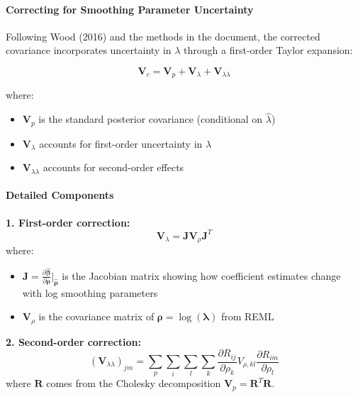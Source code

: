 \documentclass[12pt]{article}
\begin{document}
\paragraph{Correcting for Smoothing Parameter Uncertainty}
Following Wood (2016) and the methods in the document, the corrected covariance incorporates uncertainty in $\lambda$ through a first-order Taylor expansion:

\begin{equation}
\mathbf{V}_c = \mathbf{V}_p + \mathbf{V}_\lambda + \mathbf{V}_{\lambda\lambda}
\end{equation}

where:
\begin{itemize}
    \item $\mathbf{V}_p$ is the standard posterior covariance (conditional on $\hat{\lambda}$)
    \item $\mathbf{V}_\lambda$ accounts for first-order uncertainty in $\lambda$
    \item $\mathbf{V}_{\lambda\lambda}$ accounts for second-order effects
\end{itemize}

\paragraph{Detailed Components}

\textbf{1. First-order correction:}
\begin{equation}
\mathbf{V}_\lambda = \mathbf{J}\mathbf{V}_\rho\mathbf{J}^T
\end{equation}
where:
\begin{itemize}
    \item $\mathbf{J} = \frac{\partial\hat{\boldsymbol{\beta}}}{\partial\boldsymbol{\rho}}\bigg|_{\hat{\boldsymbol{\rho}}}$ is the Jacobian matrix showing how coefficient estimates change with log smoothing parameters
    \item $\mathbf{V}_\rho$ is the covariance matrix of $\boldsymbol{\rho} = \log(\boldsymbol{\lambda})$ from REML
\end{itemize}

\textbf{2. Second-order correction:}
\begin{equation}
(\mathbf{V}_{\lambda\lambda})_{jm} = \sum_{p} \sum_{i} \sum_{l} \sum_{k} \frac{\partial R_{ij}}{\partial\rho_k} V_{\rho,kl} \frac{\partial R_{im}}{\partial\rho_l}
\end{equation}
where $\mathbf{R}$ comes from the Cholesky decomposition $\mathbf{V}_p = \mathbf{R}^T\mathbf{R}$.
\end{document}
